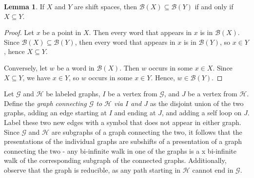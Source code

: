 \documentclass{article}
\newcommand{\Lc}{\mathcal{L}}  %
\newcommand{\Gc}{\mathcal{G}}  %
\newcommand{\Hc}{\mathcal{H}}  %
\newcommand{\Bc}{\mathcal{B}}
\newcommand{\shift}[1]{\mathsf{X}_{#1}}
\newcommand{\term}[1]{\textit{#1}}
\theoremstyle{definition}
\newtheorem{theorem}{Theorem}
\newtheorem{lemma}{Lemma}
\begin{document}


    \begin{lemma}
        If \(X\) and \(Y\) are shift spaces, then \(\Bc(X) \subseteq \Bc(Y)\) if and only if \(X \subseteq Y\).
    \end{lemma}

    \begin{proof}
        Let \(x\) be a point in \(X\). Then every word that appears in \(x\) is in \(\Bc(X)\). Since 
        \(\Bc(X) \subseteq \Bc(Y)\), then every word that appears in \(x\) is in \(\Bc(Y)\),
        so \(x \in Y\), hence \(X \subseteq Y\).

        Conversely, let \(w\) be a word in \(\Bc(X)\). Then \(w\) occurs in some \(x \in X\). 
        Since \(X \subseteq Y\), we have \(x \in Y\), so \(w\) occurs in some \(x \in Y\). Hence, \(w \in \Bc(Y)\).
    \end{proof}

    Let \(\Gc\) and \(\Hc\) be labeled graphs, \(I\) be a vertex from \(\Gc\), and \(J\) 
    be a vertex from \(\Hc\). Define the \term{graph connecting \(\Gc\) to \(\Hc\) via \(I\) and \(J\)} 
    as the disjoint union of the two graphs, adding an edge starting at \(I\) and ending at \(J\), 
    and adding a self loop on \(J\). Label these two new edges with a symbol that 
    does not appear in either graph. 
    Since \(\Gc\) and \(\Hc\) are subgraphs of a graph connecting the two,
    it follows that the presentations of the individual graphs are subshifts of a presentation 
    of a graph connecting the two - any bi-infinite walk in one of the graphs is a x
    bi-infinite walk of the corresponding subgraph of the connected graphs.
    Additionally, observe that the graph is reducible,
    as any path starting in \(\Hc\) cannot end in \(\Gc\).
    
\end{document}
